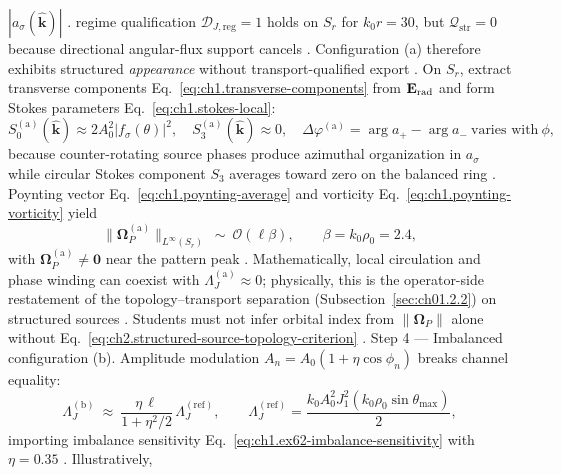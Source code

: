 \(|a_\sigma(\widehat{\mathbf{k}})|\) \cite{stratton1941}. regime qualification
\(\mathcal{D}_{J,\mathrm{reg}}=1\) holds on \(S_r\) for \(k_0 r=30\), but
\(\mathcal{Q}_{\mathrm{str}}=0\) because directional angular-flux support cancels
\cite{harrington2001}. Configuration (a) therefore exhibits structured \emph{appearance} without
transport-qualified export \cite{stratton1941}.
On \(S_r\), extract transverse components Eq.~\eqref{eq:ch1.transverse-components} from
\(\mathbf{E}_{\mathrm{rad}}\) and form Stokes parameters Eq.~\eqref{eq:ch1.stokes-local}:
\begin{equation}
\label{eq:ch2.ex-str-stokes-contrast}
S_0^{(\mathrm{a})}(\widehat{\mathbf{k}})\approx 2A_0^2|f_\sigma(\theta)|^2,\quad
S_3^{(\mathrm{a})}(\widehat{\mathbf{k}})\approx 0,\quad
\Delta\varphi^{(\mathrm{a})}=\arg a_+-\arg a_-\ \text{varies with}\ \phi,
\end{equation}
because counter-rotating source phases produce azimuthal organization in \(a_\sigma\) while
circular Stokes component \(S_3\) averages toward zero on the balanced ring
\cite{stratton1941}. Poynting vector Eq.~\eqref{eq:ch1.poynting-average} and vorticity
Eq.~\eqref{eq:ch1.poynting-vorticity} yield
\begin{equation}
\label{eq:ch2.ex-str-poynting-vorticity}
\|\boldsymbol{\Omega}_P^{(\mathrm{a})}\|_{L^{\infty}(S_r)}
\ \sim\
\mathcal{O}(\ell\beta),
\qquad
\beta=k_0\rho_0=2.4,
\end{equation}
with \(\boldsymbol{\Omega}_P^{(\mathrm{a})}\neq\mathbf{0}\) near the pattern peak
\cite{stratton1941}. Mathematically, local circulation and phase winding can coexist
with \(\Lambda_J^{(\mathrm{a})}\approx 0\); physically, this is the operator-side restatement of
the topology--transport separation (Subsection~\ref{sec:ch01.2.2}) on structured sources
\cite{belinfante1940}. Students must not infer orbital index from
\(\|\boldsymbol{\Omega}_P\|\) alone without Eq.~\eqref{eq:ch2.structured-source-topology-criterion}
\cite{harrington2001}.
Step 4 — Imbalanced configuration (b). Amplitude modulation \(A_n=A_0(1+\eta\cos\phi_n)\) breaks channel equality:
\begin{equation}
\label{eq:ch2.ex-str-imbalanced-export}
\Lambda_J^{(\mathrm{b})}
\ \approx\
\frac{\eta\,\ell}{1+\eta^{2}/2}\,\Lambda_J^{(\mathrm{ref})},
\qquad
\Lambda_J^{(\mathrm{ref})}
=
\frac{k_0 A_0^2 J_1^2(k_0\rho_0\sin\theta_{\max})}{2},
\end{equation}
importing imbalance sensitivity Eq.~\eqref{eq:ch1.ex62-imbalance-sensitivity} with
\(\eta=0.35\) \cite{stratton1941}. Illustratively,
